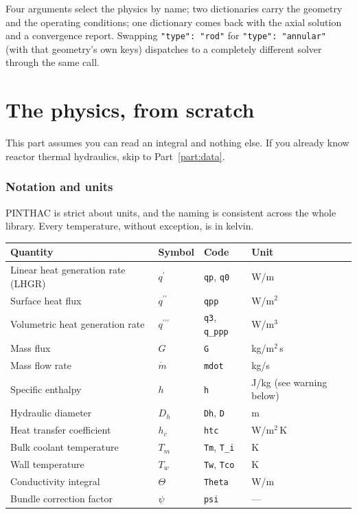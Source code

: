 \documentclass[11pt]{article}
\newcommand{\code}[1]{\texttt{#1}}
\newcommand{\qp}{q^{\prime}}
\newcommand{\qpp}{q^{\prime\prime}}
\newcommand{\qppp}{q^{\prime\prime\prime}}
\begin{document}
Four arguments select the physics by name; two dictionaries carry the geometry and the
operating conditions; one dictionary comes back with the axial solution and a
convergence report. Swapping \code{"type": "rod"} for \code{"type": "annular"} (with
that geometry's own keys) dispatches to a completely different solver through the same
call.

\newpage
\part{The physics, from scratch}

\noindent
This part assumes you can read an integral and nothing else. If you already know
reactor thermal hydraulics, skip to Part~\ref{part:data}.

\section{Notation and units}

PINTHAC is strict about units, and the naming is consistent across the whole library.
Every temperature, without exception, is in kelvin.

\begin{center}
\begin{tabular}{llll}
\toprule
Quantity & Symbol & Code & Unit \\
\midrule
Linear heat generation rate (LHGR) & $\qp$ & \code{qp}, \code{q0} & W/m \\
Surface heat flux                  & $\qpp$ & \code{qpp} & W/m$^2$ \\
Volumetric heat generation rate    & $\qppp$ & \code{q3}, \code{q\_ppp} & W/m$^3$ \\
Mass flux                          & $G$ & \code{G} & kg/m$^2$\,s \\
Mass flow rate                     & $\dot m$ & \code{mdot} & kg/s \\
Specific enthalpy                  & $h$ & \code{h} & J/kg (see warning below) \\
Hydraulic diameter                 & $D_h$ & \code{Dh}, \code{D} & m \\
Heat transfer coefficient          & $h_c$ & \code{htc} & W/m$^2$\,K \\
Bulk coolant temperature           & $T_m$ & \code{Tm}, \code{T\_i} & K \\
Wall temperature                   & $T_w$ & \code{Tw}, \code{Tco} & K \\
Conductivity integral              & $\Theta$ & \code{Theta} & W/m \\
Bundle correction factor           & $\psi$ & \code{psi} & --- \\
\bottomrule
\end{tabular}
\end{center}
\end{document}
